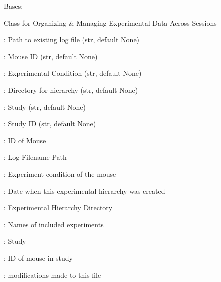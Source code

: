 \documentclass[letterpaper,10pt,english]{sphinxmanual}
\begin{document}
\begin{fulllineitems}
\label{\detokenize{Organization:Organization.Mouse}}
\pysigstartsignatures
{}
\pysigstopsignatures
\sphinxAtStartPar
Bases: 

\sphinxAtStartPar
Class for Organizing \& Managing Experimental Data Across Sessions
\begin{description}
\begin{DUlineblock}{0em}
\item[]  : Path to existing log file (str, default None)
\item[]  : Mouse ID (str, default None)
\item[]  : Experimental Condition (str, default None)
\item[]  : Directory for hierarchy (str, default None)
\item[]  : Study (str, default None)
\item[]  : Study ID (str, default None)
\end{DUlineblock}

\begin{DUlineblock}{0em}
\item[]  : ID of Mouse
\item[]  : Log Filename Path
\item[]  : Experiment condition of the mouse
\item[]  : Date when this experimental hierarchy was created
\end{DUlineblock}

\begin{DUlineblock}{0em}
\item[]  : Experimental Hierarchy Directory
\item[]  : Names of included experiments
\item[]  : Study
\item[]  : ID of mouse in study
\item[]  : modifications made to this file
\end{DUlineblock}


\end{description}
\end{fulllineitems}
\end{document}
